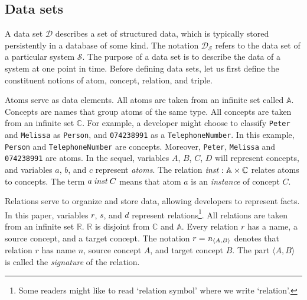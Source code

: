 \documentclass[runningheads]{llncs}
\newcommand{\id}[1]{\text{\it #1\/}}
\newcommand{\instance}{\mathbin{\id{inst}}}
\newcommand{\declare}[3]{\id{#1}_{\pair{#2}{#3}}}
\newcommand{\pair}[2]{\langle{#1},{#2}\rangle}
\newcommand{\Pair}[2]{#1\times#2}
\newcommand{\atom}[1]{{\tt\small #1}}
\newcommand{\Atoms}{\mathbb{A}}
\newcommand{\concept}[1]{{\tt\small #1}}
\newcommand{\Concepts}{\mathbb{C}}
\newcommand{\Rels}{\mathbb{R}}   %
\newcommand{\dataset}{\mathscr{D}}
\newcommand{\infsys}{\mathscr{S}}
\begin{document}
\subsection{Data sets}
\label{sct:Data sets}
   A data set $\dataset$ describes a set of structured data, which is typically stored persistently in a database of some kind.
   The notation $\dataset_{\infsys}$ refers to the data set of a particular system $\infsys$.
   The purpose of a data set is to describe the data of a system at one point in time. 
   Before defining data sets, let us first define the constituent notions of atom, concept, relation, and triple.
   
   Atoms serve as data elements.
   All atoms are taken from an infinite set called $\Atoms$.
   Concepts are names that group atoms of the same type.
   All concepts are taken from an infinite set $\Concepts$.
   For example, a developer might choose to classify \atom{Peter} and \atom{Melissa} as \concept{Person},
   and \atom{074238991} as a \concept{TelephoneNumber}.
   In this example, \concept{Person} and \concept{TelephoneNumber} are concepts.
   Moreover, \atom{Peter}, \atom{Melissa} and \atom{074238991} are atoms.
   In the sequel, variables $A$, $B$, $C$, $D$ will represent concepts, and variables $a$, $b$, and $c$ represent \emph{atoms}.
   The relation $\instance:\Pair{\Atoms}{\Concepts}$ relates atoms to concepts.
   The term $a\instance C$ means that atom $a$ is an \emph{instance} of concept $C$.

   Relations serve to organize and store data, allowing developers to represent facts.
   In this paper, variables $r$, $s$, and $d$ represent relations\footnote{Some readers might like to read `relation symbol' where we write `relation'.}.
   All relations are taken from an infinite set $\Rels$.
   $\Rels$ is disjoint from $\Concepts$ and $\Atoms$.
   Every relation $r$ has a name, a source concept, and a target concept.
   The notation $r=\declare{n}{A}{B}$ denotes that relation $r$ has name $n$, source concept $A$, and target concept $B$.
   The part $\pair{A}{B}$ is called the {\em signature} of the relation.
   
\end{document}
